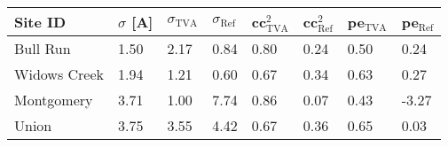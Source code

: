 \begin{tabular}{llllllll}
\toprule
Site ID & $\sigma$ [A] & $\sigma_\text{TVA}$ & $\sigma_\text{Ref}$ & cc$^2_\text{TVA}$ & cc$^2_\text{Ref}$ & pe$_\text{TVA}$ & pe$_\text{Ref}$ \\
\midrule
Bull Run & 1.50 & 2.17 & 0.84 & 0.80 & 0.24 & 0.50 & 0.24 \\
Widows Creek & 1.94 & 1.21 & 0.60 & 0.67 & 0.34 & 0.63 & 0.27 \\
Montgomery & 3.71 & 1.00 & 7.74 & 0.86 & 0.07 & 0.43 & -3.27 \\
Union & 3.75 & 3.55 & 4.42 & 0.67 & 0.36 & 0.65 & 0.03 \\
\bottomrule
\end{tabular}
